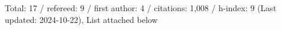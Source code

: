 Total: 17 / refereed: 9 / first author: 4 / citations: 1,008 / h-index: 9 (Last updated: 2024-10-22), List attached below